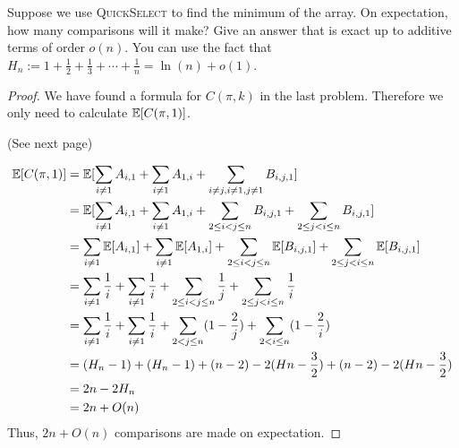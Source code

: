 \documentclass[11pt,a4paper,oneside]{article}
\newcommand{\E}{\mathop{\mathbb{E\/}}}
\begin{document}
\begin{problem}{8}
\statement
Suppose we use \textsc{QuickSelect} to find the minimum of the array. On expectation,
how many comparisons will it make? Give an answer that is exact up to additive terms 
of order $o(n)$.
You can use the fact that $H_n := 1 + \frac{1}{2} + \frac{1}{3} + \cdots  + \frac{1}{n} = \ln(n) + o(1)$.
\solution
\begin{proof}
	We have found a formula for $C(\pi,k)$ in the last problem. Therefore we only need to calculate $\E[C(\pi,1)]$.

	(See next page)

    \[
        \begin{split}
            \E[C(\pi,1)] &= \E[\sum_{i \not= 1}A_{i, 1} + \sum_{i \not= 1}A_{1, i} + \sum_{i \not= j, i \not= 1,j \not= 1}B_{i, j, 1}]\\
            &= \E[\sum_{i \not= 1}A_{i, 1} + \sum_{i \not= 1}A_{1, i} + \sum_{2 \leq i < j \leq n}B_{i, j, 1} + \sum_{2 \leq j < i \leq n}B_{i, j, 1}]\\
            &= \sum_{i \not= 1} \E[A_{i, 1}] + \sum_{i \not= 1} \E[A_{1, i}] + \sum_{2 \leq i < j \leq n}\E[B_{i, j, 1}] + \sum_{2 \leq j < i \leq n}\E[B_{i, j, 1}]\\
            &= \sum_{i \not= 1} \frac{1}{i} + \sum_{i \not= 1} \frac{1}{i} + \sum_{2 \leq i < j \leq n} \frac{1}{j} + \sum_{2 \leq j < i \leq n}\frac{1}{i}\\
            &= \sum_{i \not= 1} \frac{1}{i} + \sum_{i \not= 1} \frac{1}{i} + \sum_{2 < j \leq n}(1 - \frac{2}{j}) + \sum_{2 < i \leq n}(1 - \frac{2}{i})\\
            &= (H_n - 1) + (H_n - 1) + (n - 2) - 2(Hn - \frac{3}{2}) + (n - 2) - 2(Hn - \frac{3}{2})\\
            &= 2n - 2H_n\\
            &= 2n + O(n)
        \end{split}
    \]
    Thus, $2n + O(n)$ comparisons are made on expectation.
\end{proof}
\end{problem}
\end{document}
